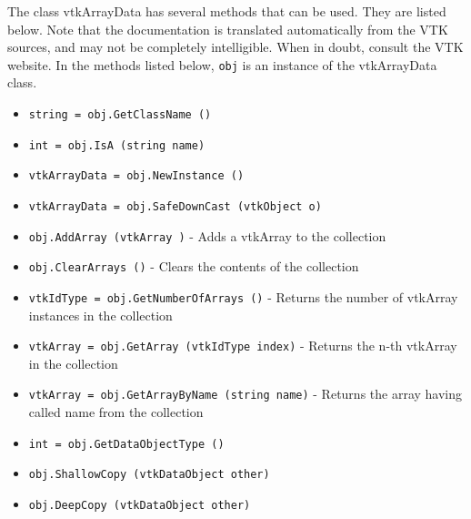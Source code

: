 The class vtkArrayData has several methods that can be used.
  They are listed below.
Note that the documentation is translated automatically from the VTK sources,
and may not be completely intelligible.  When in doubt, consult the VTK website.
In the methods listed below, \verb|obj| is an instance of the vtkArrayData class.
\begin{itemize}
\item  \verb|string = obj.GetClassName ()|

\item  \verb|int = obj.IsA (string name)|

\item  \verb|vtkArrayData = obj.NewInstance ()|

\item  \verb|vtkArrayData = obj.SafeDownCast (vtkObject o)|

\item  \verb|obj.AddArray (vtkArray )| -  Adds a vtkArray to the collection

\item  \verb|obj.ClearArrays ()| -  Clears the contents of the collection

\item  \verb|vtkIdType = obj.GetNumberOfArrays ()| -  Returns the number of vtkArray instances in the collection

\item  \verb|vtkArray = obj.GetArray (vtkIdType index)| -  Returns the n-th vtkArray in the collection

\item  \verb|vtkArray = obj.GetArrayByName (string name)| -  Returns the array having called name from the collection

\item  \verb|int = obj.GetDataObjectType ()|

\item  \verb|obj.ShallowCopy (vtkDataObject other)|

\item  \verb|obj.DeepCopy (vtkDataObject other)|

\end{itemize}
